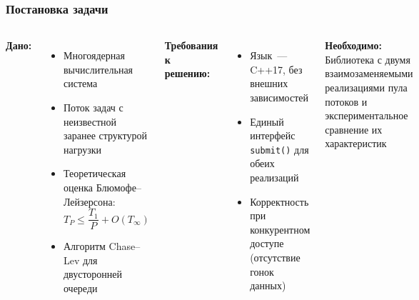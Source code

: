 \documentclass[pdf, hyperref={unicode}, aspectratio=169]{beamer}
\begin{document}
\begin{frame}
\frametitle{Постановка задачи}

\begin{columns}[T]

\textbf{Дано:}
\begin{itemize}
  \item Многоядерная вычислительная система
  \item Поток задач с неизвестной заранее структурой нагрузки
  \item Теоретическая оценка Блюмофе--Лейзерсона:
        \[T_P \le \frac{T_1}{P} + O(T_\infty)\]
  \item Алгоритм Chase--Lev для двусторонней очереди
\end{itemize}

\textbf{Требования к решению:}
\begin{itemize}
  \item Язык~--- C++17, без внешних зависимостей
  \item Единый интерфейс \texttt{submit()} для обеих реализаций
  \item Корректность при конкурентном доступе
        (отсутствие гонок данных)
\end{itemize}

\medskip
\textbf{Необходимо:}\\
Библиотека с двумя взаимозаменяемыми реализациями пула потоков
и экспериментальное сравнение их характеристик
\end{columns}
\end{frame}
\end{document}
